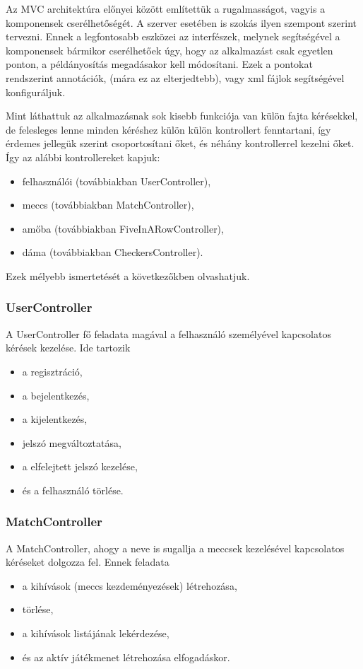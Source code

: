Az MVC architektúra előnyei között említettük a rugalmasságot, vagyis a komponensek cserélhetőségét. A szerver esetében is szokás ilyen szempont szerint tervezni. Ennek a legfontosabb eszközei az interfészek, melynek segítségével a komponensek bármikor cserélhetőek úgy, hogy az alkalmazást csak egyetlen ponton, a példányosítás megadásakor kell módosítani. Ezek a pontokat rendszerint annotációk, (mára ez az elterjedtebb), vagy xml fájlok segítségével konfiguráljuk.

Mint láthattuk az alkalmazásnak sok kisebb funkciója van külön fajta kérésekkel, de felesleges lenne minden kéréshez külön külön kontrollert fenntartani, így érdemes jellegük szerint csoportosítani őket, és néhány kontrollerrel kezelni őket. Így az alábbi kontrollereket kapjuk:
\begin{itemize}
	\item felhasználói (továbbiakban UserController),
	\item meccs (továbbiakban MatchController),
	\item amőba (továbbiakban FiveInARowController),
	\item dáma (továbbiakban CheckersController).
\end{itemize}
Ezek mélyebb ismertetését a következőkben olvashatjuk.

\subsubsection{UserController}
A UserController fő feladata magával a felhasználó személyével kapcsolatos kérések kezelése. Ide tartozik
\begin{itemize}
	\item a regisztráció,
	\item a bejelentkezés,
	\item a kijelentkezés,
	\item jelszó megváltoztatása,
	\item a elfelejtett jelszó kezelése,
	\item és a felhasználó törlése.
\end{itemize}

\subsubsection{MatchController}
A MatchController, ahogy a neve is sugallja a meccsek kezelésével kapcsolatos kéréseket dolgozza fel. Ennek feladata
\begin{itemize}
	\item a kihívások (meccs kezdeményezések) létrehozása,
	\item törlése,
	\item a kihívások listájának lekérdezése,
	\item és az aktív játékmenet létrehozása elfogadáskor.
\end{itemize}

